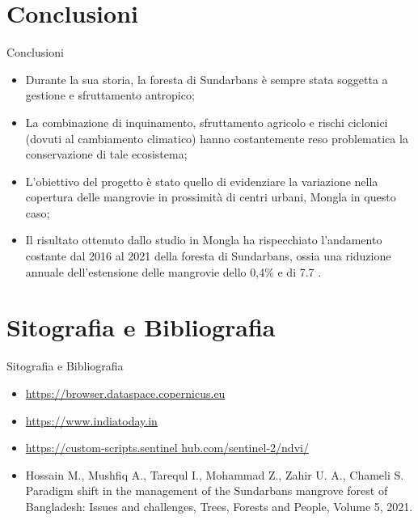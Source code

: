 \documentclass{beamer} %
\begin{document}
                
\section{Conclusioni}

        \begin{frame}{Conclusioni}
            \begin{itemize}
                \item 
                Durante la sua storia, la foresta di Sundarbans è sempre stata soggetta a gestione e sfruttamento antropico;
                \pause \item 
                La combinazione di inquinamento, sfruttamento agricolo e rischi ciclonici (dovuti al cambiamento climatico) hanno costantemente reso problematica la conservazione di tale ecosistema;
                \pause \item
                L'obiettivo del progetto è stato quello di evidenziare  la variazione nella copertura delle mangrovie in prossimità di centri urbani, Mongla in questo caso;  
                \pause \item Il risultato ottenuto dallo studio in Mongla ha rispecchiato l'andamento costante dal 2016 al 2021 della foresta di Sundarbans, ossia una riduzione annuale dell'estensione delle mangrovie dello 0,4\% e di 7.7 .
             
        
            \end{itemize}
               
               
        \end{frame}
     
  \section{Sitografia e Bibliografia}
        \begin{frame}{Sitografia e Bibliografia}
            \begin{itemize}
\item \url{https://browser.dataspace.copernicus.eu} \\
\item \url{https://www.indiatoday.in} \\
 \item \url{https://custom-scripts.sentinel hub.com/sentinel-2/ndvi/}\\
 \item Hossain M., Mushfiq A., Tarequl I., Mohammad Z., Zahir U. A., Chameli S.
Paradigm shift in the management of the Sundarbans mangrove forest of Bangladesh: Issues and challenges, Trees, Forests and People, Volume 5, 2021.
            \end{itemize}  
        \end{frame}
        
\end{document}
